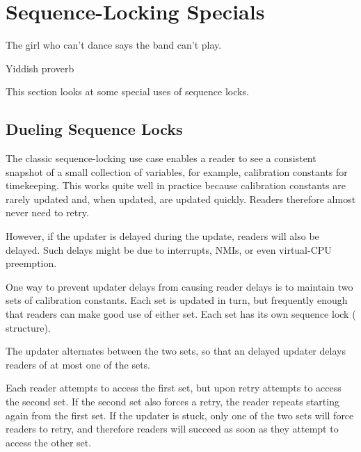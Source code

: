 
\section{Sequence-Locking Specials}
\label{sec:together:Sequence-Locking Specials}
%
\epigraph{The girl who can't dance says the band can't play.}
	 {Yiddish proverb}

This section looks at some special uses of sequence locks.

\subsection{Dueling Sequence Locks}
\label{sec:together:Dueling Sequence Locks}

The classic sequence-locking use case enables a reader to see a consistent
snapshot of a small collection of variables, for example, calibration
constants for timekeeping.
This works quite well in practice because calibration constants are
rarely updated and, when updated, are updated quickly.
Readers therefore almost never need to retry.

However, if the updater is delayed during the update, readers will
also be delayed.
Such delays might be due to interrupts, NMIs, or even
virtual-CPU preemption.

One way to prevent updater delays from causing reader delays is to
maintain two sets of calibration constants.
Each set is updated in turn, but frequently enough that readers can
make good use of either set.
Each set has its own sequence lock ( structure).

The updater alternates between the two sets, so that an delayed updater
delays readers of at most one of the sets.

Each reader attempts to access the first set, but upon retry attempts
to access the second set.
If the second set also forces a retry, the reader repeats starting
again from the first set.
If the updater is stuck, only one of the two sets will force
readers to retry, and therefore readers will succeed as soon as
they attempt to access the other set.

\QuickQuizEnd

